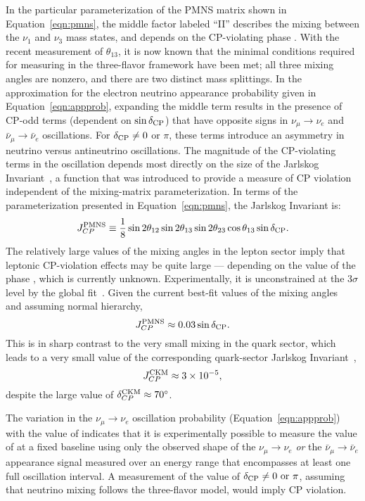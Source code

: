 In the particular parameterization of the PMNS matrix shown in
Equation~\ref{eqn:pmns}, the middle factor labeled ``II'' describes
the mixing between the $\nu_1$ and $\nu_3$ mass states, and depends on
the CP-violating phase \deltacp.  With the recent measurement of
$\theta_{13}$, it is now known that the minimal conditions required
for measuring \deltacp in the three-flavor framework have been met;
all three mixing angles are nonzero, and there are two distinct mass
splittings.  In the approximation for the electron neutrino appearance
probability given in Equation~\ref{eqn:appprob}, expanding the middle
term results in the presence of CP-odd terms (dependent on $\sin
\mdeltacp$) that have opposite signs in $\nu_{\mu} \rightarrow \nu_e$
and $\bar{\nu}_{\mu} \rightarrow \bar{\nu}_e$ oscillations.
For $\mdeltacp \neq 0$ or $\pi$, these terms introduce an asymmetry in
neutrino versus antineutrino oscillations. The magnitude of the
CP-violating terms in the oscillation depends most directly on the
size of the Jarlskog Invariant~\cite{Jarlskog:1985cw}, a function that
was introduced to provide a measure of CP violation independent of the
mixing-matrix parameterization. In terms of the parameterization
presented in Equation~\ref{eqn:pmns}, the Jarlskog Invariant is:
%
\begin{equation}
J_{CP}^{\rm PMNS} \equiv \frac{1}{8} \sin 2 \theta_{12} \sin 2 \theta_{13}
\sin 2 \theta_{23} \cos \theta_{13} \sin \mdeltacp.
\end{equation}
The relatively large values of the mixing angles in the lepton sector imply that
leptonic CP-violation effects may be quite large ---  
depending on the value of the phase \deltacp, which is currently unknown. 
Experimentally, it is unconstrained at the 3$\sigma$ level by the global fit~\cite{Gonzalez-Garcia:2014bfa}.
Given the current best-fit values of the mixing angles~\cite{Gonzalez-Garcia:2014bfa} and assuming normal hierarchy,
\begin{equation}
J_{CP}^{\rm PMNS} \approx 0.03 \sin \mdeltacp.
\end{equation}
This is in sharp contrast to the very small mixing in the quark sector,  
which leads to a very small value of the corresponding quark-sector
Jarlskog Invariant~\cite{Beringer:1900zz},
\begin{equation}
J_{CP}^{\rm CKM} \approx 3 \times 10^{-5},
\end{equation}
despite the large value of $\delta^{\rm CKM}_{CP}\approx70^{\circ}$.

The variation in the $\nu_\mu \rightarrow
\nu_e$ oscillation probability (Equation~\ref{eqn:appprob}) with the value of \deltacp
indicates that it is experimentally possible to measure the value of
\deltacp at a fixed baseline using only the observed shape of the
$\nu_\mu \rightarrow \nu_e$ {\em or} the 
$\bar{\nu}_\mu \rightarrow \bar{\nu}_e$
appearance signal measured over an energy range that encompasses at
least one full oscillation interval. A measurement of the value of
$\mdeltacp \neq 0 \ {\rm or} \ \pi$, assuming that neutrino mixing follows the three-flavor model, would imply CP violation.  

